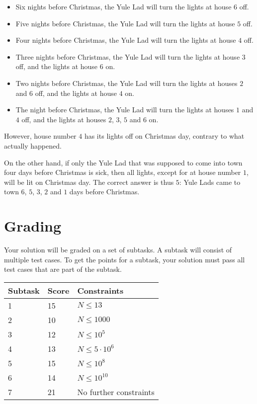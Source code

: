\begin{itemize}
    \item Six nights before Christmas, the Yule Lad will turn the lights at house $6$ off.
    \item Five nights before Christmas, the Yule Lad will turn the lights at house $5$ off.
    \item Four nights before Christmas, the Yule Lad will turn the lights at house $4$ off.
    \item Three nights before Christmas, the Yule Lad will turn the lights at house $3$ off, and the lights at house $6$ on.
    \item Two nights before Christmas, the Yule Lad will turn the lights at houses $2$ and $6$ off, and the lights at house $4$ on.
    \item The night before Christmas, the Yule Lad will turn the lights at houses $1$ and $4$ off, and the lights at houses $2$, $3$, $5$ and $6$ on.
\end{itemize}

However, house number $4$ has its lights off on Christmas day, contrary to what
actually happened.

On the other hand, if only the Yule Lad that was supposed to come into town
four days before Christmas is sick, then all lights, except for at house number
$1$, will be lit on Christmas day. The correct answer is thus $5$: Yule Lads
came to town $6$, $5$, $3$, $2$ and $1$ days before Christmas.

\section*{Grading}
Your solution will be graded on a set of subtasks.
A subtask will consist of multiple test cases.
To get the points for a subtask, your solution must pass all test cases that are part of the subtask.

\noindent
\begin{tabular}{| l | l | l |}
\hline
Subtask & Score & Constraints \\ \hline
1 & 15 & $N \leq 13$ \\ \hline
2 & 10 & $N \leq 1000$ \\ \hline
3 & 12 & $N \leq 10^5$ \\ \hline
4 & 13 & $N \leq 5 \cdot 10^{6}$ \\ \hline
5 & 15 & $N \leq 10^{8}$ \\ \hline
6 & 14 & $N \leq 10^{10}$ \\ \hline
7 & 21 & No further constraints \\ \hline
\end{tabular}

